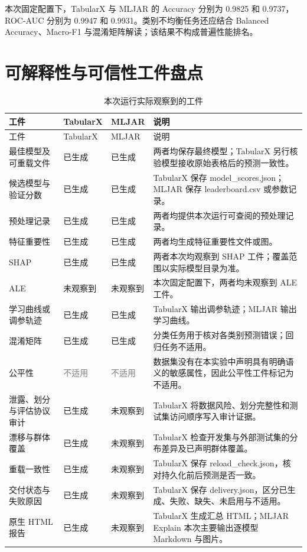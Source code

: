 \documentclass[degree=bachelor,language=chinese,fontset=fandol]{thuthesis}
\newcommand{\yes}{\textcolor{green!50!black}{已生成}}
\newcommand{\no}{\textcolor{red!70!black}{未观察到}}
\newcommand{\na}{\textcolor{gray}{不适用}}
\begin{document}
本次固定配置下，TabularX 与 MLJAR 的 Accuracy 分别为 0.9825 和 0.9737，ROC-AUC 分别为 0.9947 和 0.9931。类别不均衡任务还应结合 Balanced Accuracy、Macro-F1 与混淆矩阵解读；该结果不构成普遍性能排名。

\section{可解释性与可信性工件盘点}
\begin{longtable}{>{\raggedright\arraybackslash}p{}>{\centering\arraybackslash}p{}>{\centering\arraybackslash}p{}>{\raggedright\arraybackslash}p{}}
  \caption{本次运行实际观察到的工件}\label{tab:artifacts}\\
  \toprule
  工件 & TabularX & MLJAR & 说明 \\
  \midrule
  \endfirsthead
  \toprule
  工件 & TabularX & MLJAR & 说明 \\
  \midrule
  \endhead
  最佳模型及可重载文件 & \yes & \yes & 两者均保存最终模型；TabularX 另行核验模型接收原始表格后的预测一致性。 \\
  候选模型与验证分数 & \yes & \yes & TabularX 保存 model\_scores.json；MLJAR 保存 leaderboard.csv 或参数记录。 \\
  预处理记录 & \yes & \yes & 两者均提供本次运行可查阅的预处理记录。 \\
  特征重要性 & \yes & \yes & 两者均生成特征重要性文件或图。 \\
  SHAP & \yes & \yes & 两者本次均观察到 SHAP 工件；覆盖范围以实际模型目录为准。 \\
  ALE & \no & \no & 本次固定配置下，两者均未观察到 ALE 工件。 \\
  学习曲线或调参轨迹 & \yes & \yes & TabularX 输出调参轨迹；MLJAR 输出学习曲线。 \\
  混淆矩阵 & \yes & \yes & 分类任务用于核对各类别预测错误；回归任务不适用。 \\
  公平性 & \na & \na & 数据集没有在本实验中声明具有明确语义的敏感属性，因此公平性工件标记为不适用。 \\
  泄露、划分与评估协议审计 & \yes & \no & TabularX 将数据风险、划分完整性和测试集访问顺序写入审计证据。 \\
  漂移与群体覆盖 & \yes & \no & TabularX 检查开发集与外部测试集的分布差异及已声明群体覆盖。 \\
  重载一致性 & \yes & \no & TabularX 保存 reload\_check.json，核对持久化前后预测是否一致。 \\
  交付状态与失败原因 & \yes & \no & TabularX 保存 delivery.json，区分已生成、失败、缺失、未启用与不适用。 \\
  原生 HTML 报告 & \yes & \no & TabularX 生成汇总 HTML；MLJAR Explain 本次主要输出逐模型 Markdown 与图片。 \\
  \bottomrule
\end{longtable}
\end{document}
